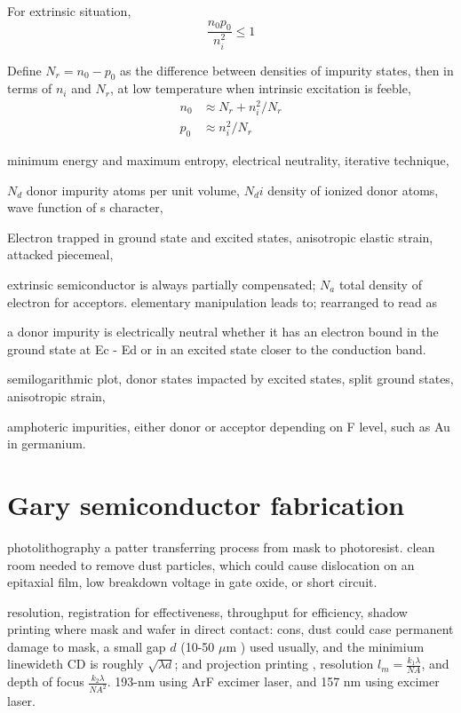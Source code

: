 For extrinsic situation, 
\[
\frac{n_0p_0}{n_i^2} \leq 1
\]

Define $N_r = n_0 - p_0$ as the difference between densities of impurity states, then in terms of $n_i$ and $N_r$, at low temperature when intrinsic excitation is feeble, 
\begin{align}
n_0 &\approx N_r + n_i^2/N_r\\
p_0 &\approx n_i^2/N_r
\end{align}


minimum energy and maximum entropy, electrical neutrality, iterative technique, 

$N_d$ donor impurity atoms per unit volume, $N_di$ density of ionized donor atoms, wave function of s character, 

Electron trapped in ground state and excited states, anisotropic elastic strain, attacked piecemeal, 

extrinsic semiconductor is always partially compensated; $N_a$ total density of electron for acceptors. elementary manipulation leads to; rearranged to read as

a donor impurity is electrically neutral whether it has an electron bound in the ground state at Ec - Ed or in an excited state closer to the conduction band. 

semilogarithmic plot, donor states impacted by excited states, split ground states, anisotropic strain, 

amphoteric impurities, either donor or acceptor depending on F level, such as Au in germanium. 

\section{Gary semiconductor fabrication} 

photolithography a patter transferring process from mask to photoresist. clean room needed to remove dust particles, which could cause dislocation on an epitaxial film, low breakdown voltage in gate oxide, or short circuit. 

resolution, registration for effectiveness, throughput for efficiency, shadow printing where mask and wafer in direct contact: cons, dust could case permanent damage to mask, a small gap $d$ (10-50 $\mu$m ) used usually, and the minimium linewideth CD is roughly $\sqrt{\lambda d}$; and projection printing , resolution $l_m = \frac{k_1 \lambda}{NA}$, and depth of focus $\frac{k_2 \lambda}{NA^2}$. 193-nm using ArF excimer laser, and 157 nm using  excimer laser. 

